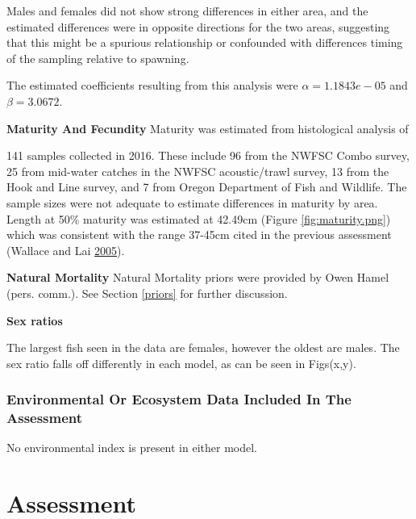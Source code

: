 \documentclass[12pt,]{article}
\begin{document}
Males and females did not show strong differences in either area, and
the estimated differences were in opposite directions for the two areas,
suggesting that this might be a spurious relationship or confounded with
differences timing of the sampling relative to spawning.

The estimated coefficients resulting from this analysis were
\(\alpha = 1.1843e-05\) and \(\beta = 3.0672\).

\vspace{.5cm}

\textbf{Maturity And Fecundity} Maturity was estimated from histological
analysis of

141 samples collected in 2016. These include 96 from the NWFSC Combo
survey, 25 from mid-water catches in the NWFSC acoustic/trawl survey, 13
from the Hook and Line survey, and 7 from Oregon Department of Fish and
Wildlife. The sample sizes were not adequate to estimate differences in
maturity by area. Length at 50\% maturity was estimated at 42.49cm
(Figure \ref{fig:maturity.png}) which was consistent with the range
37-45cm cited in the previous assessment (Wallace and Lai
\protect\hyperlink{ref-Wallace2005}{2005}).

\vspace{.5cm}

\textbf{Natural Mortality} Natural Mortality priors were provided by
Owen Hamel (pers. comm.). See Section \ref{priors} for further
discussion.

\vspace{.5cm}

\textbf{Sex ratios}

The largest fish seen in the data are females, however the oldest are
males. The sex ratio falls off differently in each model, as can be seen
in Figs(x,y).

\subsubsection{Environmental Or Ecosystem Data Included In The
Assessment}\label{environmental-or-ecosystem-data-included-in-the-assessment}

No environmental index is present in either model.

\newpage

\section{Assessment}\label{assessment}
\end{document}
